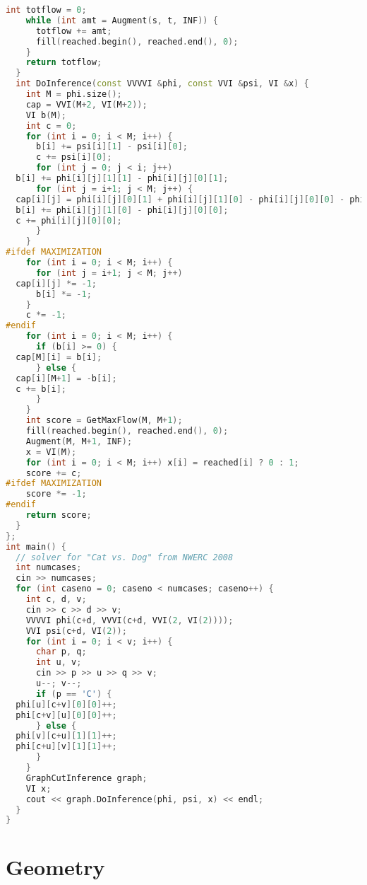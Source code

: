 \begin{lstlisting}[language=C++]
    int totflow = 0;
    while (int amt = Augment(s, t, INF)) {
      totflow += amt;
      fill(reached.begin(), reached.end(), 0);
    }
    return totflow;
  }
  int DoInference(const VVVVI &phi, const VVI &psi, VI &x) {
    int M = phi.size();
    cap = VVI(M+2, VI(M+2));
    VI b(M);
    int c = 0;
    for (int i = 0; i < M; i++) {
      b[i] += psi[i][1] - psi[i][0];
      c += psi[i][0];
      for (int j = 0; j < i; j++)
  b[i] += phi[i][j][1][1] - phi[i][j][0][1];
      for (int j = i+1; j < M; j++) {
  cap[i][j] = phi[i][j][0][1] + phi[i][j][1][0] - phi[i][j][0][0] - phi[i][j][1][1];
  b[i] += phi[i][j][1][0] - phi[i][j][0][0];
  c += phi[i][j][0][0];
      }
    }
#ifdef MAXIMIZATION
    for (int i = 0; i < M; i++) {
      for (int j = i+1; j < M; j++) 
  cap[i][j] *= -1;
      b[i] *= -1;
    }
    c *= -1;
#endif
    for (int i = 0; i < M; i++) {
      if (b[i] >= 0) {
  cap[M][i] = b[i];
      } else {
  cap[i][M+1] = -b[i];
  c += b[i];
      }
    }
    int score = GetMaxFlow(M, M+1);
    fill(reached.begin(), reached.end(), 0);
    Augment(M, M+1, INF);
    x = VI(M);
    for (int i = 0; i < M; i++) x[i] = reached[i] ? 0 : 1;
    score += c;
#ifdef MAXIMIZATION
    score *= -1;
#endif
    return score;
  }
};
int main() {
  // solver for "Cat vs. Dog" from NWERC 2008
  int numcases;
  cin >> numcases;
  for (int caseno = 0; caseno < numcases; caseno++) {
    int c, d, v;
    cin >> c >> d >> v;
    VVVVI phi(c+d, VVVI(c+d, VVI(2, VI(2))));
    VVI psi(c+d, VI(2));
    for (int i = 0; i < v; i++) {
      char p, q;
      int u, v;
      cin >> p >> u >> q >> v;
      u--; v--;
      if (p == 'C') {
  phi[u][c+v][0][0]++;
  phi[c+v][u][0][0]++;
      } else {
  phi[v][c+u][1][1]++;
  phi[c+u][v][1][1]++;
      }
    }
    GraphCutInference graph;
    VI x;
    cout << graph.DoInference(phi, psi, x) << endl;
  }
}
\end{lstlisting}
\section{Geometry}
